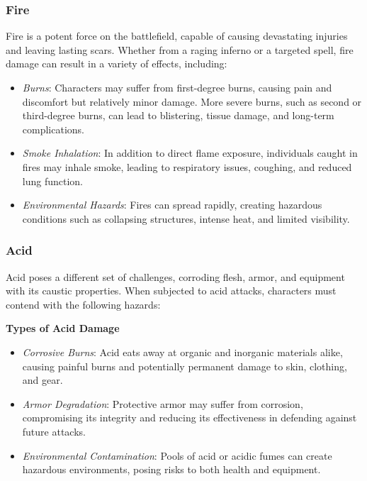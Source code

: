 \hypertarget{fire}{%
\subsubsection{Fire}\label{fire}}

Fire is a potent force on the battlefield, capable of causing
devastating injuries and leaving lasting scars. Whether from a raging
inferno or a targeted spell, fire damage can result in a variety of
effects, including:

\begin{itemize}
\tightlist
\item
  \emph{Burns}: Characters may suffer from first-degree burns, causing
  pain and discomfort but relatively minor damage. More severe burns,
  such as second or third-degree burns, can lead to blistering, tissue
  damage, and long-term complications.
\item
  \emph{Smoke Inhalation}: In addition to direct flame exposure,
  individuals caught in fires may inhale smoke, leading to respiratory
  issues, coughing, and reduced lung function.
\item
  \emph{Environmental Hazards}: Fires can spread rapidly, creating
  hazardous conditions such as collapsing structures, intense heat, and
  limited visibility.
\end{itemize}

\hypertarget{acid}{%
\subsubsection{Acid}\label{acid}}

Acid poses a different set of challenges, corroding flesh, armor, and
equipment with its caustic properties. When subjected to acid attacks,
characters must contend with the following hazards:

\textbf{Types of Acid Damage}

\begin{itemize}
\tightlist
\item
  \emph{Corrosive Burns}: Acid eats away at organic and inorganic
  materials alike, causing painful burns and potentially permanent
  damage to skin, clothing, and gear.
\item
  \emph{Armor Degradation}: Protective armor may suffer from corrosion,
  compromising its integrity and reducing its effectiveness in defending
  against future attacks.
\item
  \emph{Environmental Contamination}: Pools of acid or acidic fumes can
  create hazardous environments, posing risks to both health and
  equipment.
\end{itemize}

